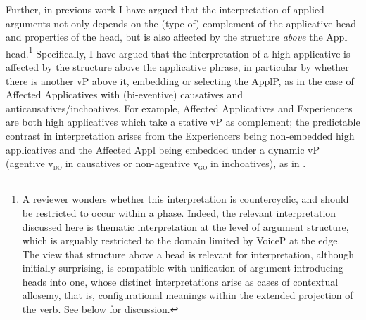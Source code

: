 \documentclass[output=paper,colorlinks,citecolor=brown,nonflat]{./langscibook}
\begin{document}
Further, in previous work I have argued that the interpretation of applied arguments not only depends on the (type of) complement of the applicative head and properties of the head, but is also affected by the structure \textit{above} the Appl head.\footnote{A reviewer wonders whether this interpretation is countercyclic, and should be restricted to occur within a phase. Indeed, the relevant interpretation discussed here is thematic interpretation at the level of argument structure, which is arguably restricted to the domain limited by VoiceP at the edge. The view that structure above a head is relevant for interpretation, although initially surprising, is compatible with  unification of argument-introducing heads into one, whose distinct interpretations arise as cases of contextual allosemy, that is, configurational meanings within the extended projection of the verb. See below for discussion.} Specifically, I have argued that the interpretation of a high applicative is affected by the structure above the applicative phrase, in particular by whether there is another vP above it, embedding or selecting the ApplP, as in the case of Affected Applicatives with (bi-eventive) causatives and anticausatives/inchoatives. For example, Affected Applicatives  and Experiencers  are both high applicatives which take a stative vP as complement; the predictable contrast in interpretation arises from the Experiencers being non-embedded high applicatives  and the Affected Appl being embedded under a dynamic vP (agentive v\textsc{\textsubscript{do}} in causatives or non-agentive v\textsc{\textsubscript{go}} in inchoatives), as in .
\end{document}
